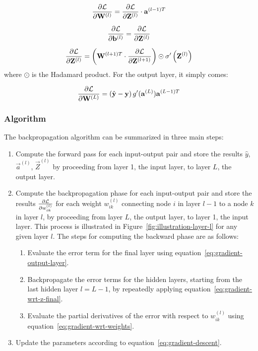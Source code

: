 \begin{equation}
    \label{eq:gradient-wrt-weights-matrix}
    \frac{\partial \mathcal{L}}{\partial \mathbf{W}^{(l)}} = \frac{\partial \mathcal{L}}{\partial \mathbf{Z}^{(l)}} \cdot \mathbf{a}^{(l-1)T}
\end{equation}

\begin{equation}
    \label{eq:gradient-wrt-bias-matrix}
    \frac{\partial \mathcal{L}}{\partial \mathbf{b}^{(l)}} = \frac{\partial \mathcal{L}}{\partial \mathbf{Z}^{(l)}}
\end{equation}

\begin{equation}
    \label{eq:gradient-wrt-z-final-matrix}
    \frac{\partial \mathcal{L}}{\partial \mathbf{Z}^{(l)}} = \left(\mathbf{W}^{(l+1)T} \cdot \frac{\partial \mathcal{L}}{\partial \mathbf{Z}^{(l+1)}} \right) \odot \sigma'\left(\mathbf{Z}^{(l)}\right)
\end{equation}
where $\odot$ is the Hadamard product. For the output layer, it simply comes:

\begin{equation}
\label{eq:gradient-output-layer}
    \frac{\partial\mathcal{L}}{\partial \mathbf{W}^{(L)}} = \left(\hat{\mathbf{y}} - \mathbf{y}\right) g'(\mathbf{a}^{(L)}) \mathbf{a}^{(L-1)T}
\end{equation}

\subsubsection{Algorithm}
The backpropagation algorithm can be summarized in three main steps:
\begin{enumerate}
    \item Compute the forward pass for each input-output pair and store the results $\hat{y}$, $\Vec{a}^{(l)}$, $\Vec{Z}^{(l)}$ by proceeding from layer 1, the input layer, to layer $L$, the output layer.
    \item Compute the backpropagation phase for each input-output pair and store the results $\frac{\partial \mathcal{L}}{\partial w_{ik}^{(l)}}$ for each weight $ w_{ik}^{(l)}$ connecting node $i$ in layer $l-1$ to a node $k$ in layer $l$, by proceeding from layer $L$, the output layer, to layer 1, the input layer. This process is illustrated in Figure~\ref{fig:illustration-layer-l} for any given layer $l$. The steps for computing the backward phase are as follows: 
    \begin{enumerate}
        \item Evaluate the error term for the final layer using equation~\eqref{eq:gradient-output-layer}.
        \item Backpropagate the error terms for the hidden layers, starting from the last hidden layer $l=L-1$, by repeatedly applying equation~\eqref{eq:gradient-wrt-z-final}.
        \item Evaluate the partial derivatives of the error with respect to $w_{ik}^{(l)}$ using equation~\eqref{eq:gradient-wrt-weights}.
    \end{enumerate}
    \item Update the parameters according to equation~\eqref{eq:gradient-descent}.
\end{enumerate}

